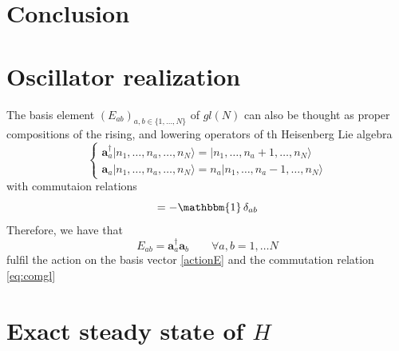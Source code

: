\documentclass[10pt]{article}
\numberwithin{equation}{section}
\numberwithin{equation}{subsection}
\newcommand{\oa}{\mathbf{a}}
\newcommand{\oad}{\mathbf{a}^{\dagger}}
\begin{document}
\section{Conclusion}








\appendix
{\color{blue}
\section{Oscillator realization}\label{appA}

 The basis element $ (E_{ab})_{a,b\in\{1,\ldots,N\}}$ of $gl(N)$ can also be thought as proper compositions of the rising, and lowering operators of th Heisenberg Lie algebra
  \begin{equation}\label{creationOperators}
	\begin{cases}
	\oad_{a}|n_{1},\ldots,n_{a},\ldots,n_{N}\rangle = |n_{1},\ldots,n_{a}+1,\ldots,n_{N}\rangle\\
	\oa_{a}|n_{1},\ldots,n_{a},\ldots,n_{N}\rangle =n_{a}|n_{1},\ldots,n_{a}-1,\ldots,n_{N}\rangle
	\end{cases}
\end{equation}
with commutaion relations
\begin{equation}
	[\oad_{a},\oa_{b}]=-\mathbbm{1}\,\delta_{ab}
\end{equation}
Therefore, we have that 
\begin{equation}
		E_{ab}=\oad_{a}\oa_{b}\qquad \forall a,b=1,\ldots N
\end{equation} 
fulfil the action on the basis vector \eqref{actionE} and the commutation relation \eqref{eq:comgl} }
\section{Exact steady state of $H$}\label{appB}
\end{document}
